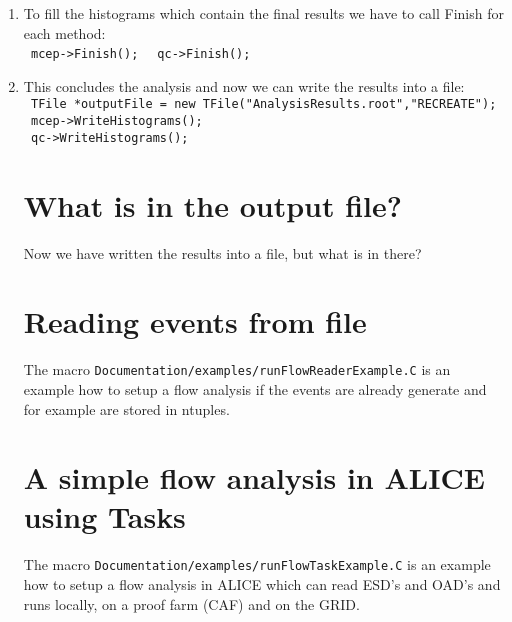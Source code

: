 \begin{enumerate}
\texttt{for(Int\textunderscore t i=0; i<nEvts; i++) \{}\\
\texttt{      // make an event with mult particles }\\
\texttt{      AliFlowEventSimple* event = new AliFlowEventSimple(mult,AliFlowEventSimple::kGenerate);}\\
\texttt{      // modify the tracks adding the flow value v2}\\
\texttt{       event->AddV2(v2);}\\
\texttt{      // select the particles for the reference flow}\\
\texttt{      event->TagRP(cutsRP);}\\
\texttt{      // select the particles for differential flow}\\
\texttt{      event->TagPOI(cutsPOI);}\\
\texttt{      // do flow analysis with various methods:}\\
\texttt{      mcep->Make(event);}\\
\texttt{      qc->Make(event);}\\
\texttt{    \} // end of for(Int\textunderscore t i=0;i<nEvts;i++)}\\
\item
To fill the histograms which contain the final results we have to call Finish for each method:\\
\texttt{ mcep->Finish(); }  \texttt{ qc->Finish(); }\\
\item
This concludes the analysis and now we can write the results into a file:\\
\texttt{ TFile *outputFile = new TFile("AnalysisResults.root","RECREATE");}\\
\texttt{ mcep->WriteHistograms();}\\
\texttt{ qc->WriteHistograms();}\\

\section{What is in the output file?}
Now we have written the results into a file, but what is in there?

\section{Reading events from file}
The macro \texttt{Documentation/examples/runFlowReaderExample.C} is an example how to setup a flow analysis if the events are already generate and
for example are stored in ntuples.
 
\section{A simple flow analysis in ALICE using Tasks}
The macro \texttt{Documentation/examples/runFlowTaskExample.C} is an example how to setup a flow analysis in ALICE which can read ESD's and OAD's
and runs locally, on a proof farm (CAF) and on the GRID.


\end{enumerate}
